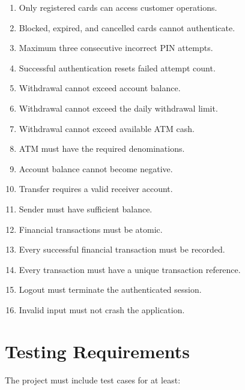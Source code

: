\documentclass[12pt,a4paper]{article}
\begin{document}
\begin{enumerate}
    \item Only registered cards can access customer operations.
    \item Blocked, expired, and cancelled cards cannot authenticate.
    \item Maximum three consecutive incorrect PIN attempts.
    \item Successful authentication resets failed attempt count.
    \item Withdrawal cannot exceed account balance.
    \item Withdrawal cannot exceed the daily withdrawal limit.
    \item Withdrawal cannot exceed available ATM cash.
    \item ATM must have the required denominations.
    \item Account balance cannot become negative.
    \item Transfer requires a valid receiver account.
    \item Sender must have sufficient balance.
    \item Financial transactions must be atomic.
    \item Every successful financial transaction must be recorded.
    \item Every transaction must have a unique transaction reference.
    \item Logout must terminate the authenticated session.
    \item Invalid input must not crash the application.
\end{enumerate}


\section{Testing Requirements}

The project must include test cases for at least:
\end{document}
